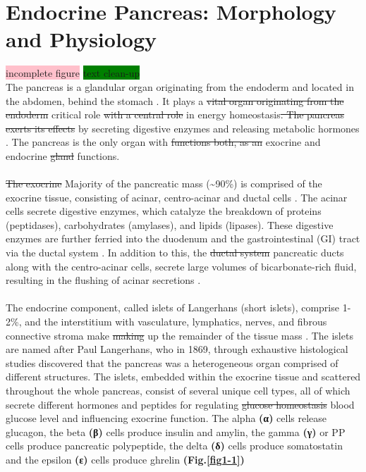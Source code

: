 \section{Endocrine Pancreas: Morphology and Physiology}  %
\label{sec:sec1-1endopanc}

\colorbox{pink}{incomplete figure} \colorbox{green}{text clean-up}\\

The pancreas is a glandular organ originating from the endoderm and located in the abdomen, behind the stomach \textbf{\cite{shih_pancreas_2013}}. It plays a \st{vital organ originating from the endoderm} critical role \st{with a central role} in energy homeostasis\st{. The pancreas exerts its effects} by secreting digestive enzymes and releasing metabolic hormones \textbf{\cite{kimmel_molecular_2010, baron_single-cell_2016}}. The pancreas is the only organ with \st{functions both, as an} exocrine and endocrine \st{gland} functions.  
\\\\
\st{The exocrine} Majority of the pancreatic mass (\textasciitilde 90\%) is comprised of the exocrine tissue, consisting of acinar, centro-acinar and ductal cells \textbf{\cite{pandiri_overview_2014}}. The acinar cells secrete digestive enzymes, which catalyze the breakdown of proteins (peptidases), carbohydrates (amylases), and lipids (lipases). These digestive enzymes are further ferried into the duodenum and the gastrointestinal (GI) tract via the ductal system \textbf{\cite{shih_pancreas_2013, baron_single-cell_2016}}.  In addition to this, the \st{ductal system} pancreatic ducts along with the centro-acinar cells, secrete large volumes of bicarbonate-rich fluid, resulting in the flushing of acinar secretions \textbf{\cite{pandiri_overview_2014, low_pancreatic_2010}}. 
\\\\
The endocrine component, called islets of Langerhans (short islets), comprise 1-2\%, and the interstitium with vasculature, lymphatics, nerves, and fibrous connective stroma make \st{making} up the remainder of the tissue mass \textbf{\cite{pandiri_overview_2014}}. The islets are named after Paul Langerhans, who in 1869, through exhaustive histological studies discovered that the pancreas was a heterogeneous organ comprised of different structures. The islets, embedded within the exocrine tissue and scattered throughout the whole pancreas, consist of several unique cell types, all of which secrete different hormones and peptides for regulating \st{glucose homeostasis}  blood glucose level \textbf{\cite{shih_pancreas_2013, baron_single-cell_2016}} and influencing exocrine function.  The alpha \textbf{(α)} cells release glucagon, the beta \textbf{(β)} cells produce insulin and amylin, the gamma \textbf{(γ)} or PP cells produce pancreatic polypeptide, the delta \textbf{(δ)} cells produce somatostatin and the epsilon \textbf{(ε)} cells produce ghrelin \textbf{\cite{mastracci_endocrine_2012}  (Fig.\ref{fig1-1})} 
\\


